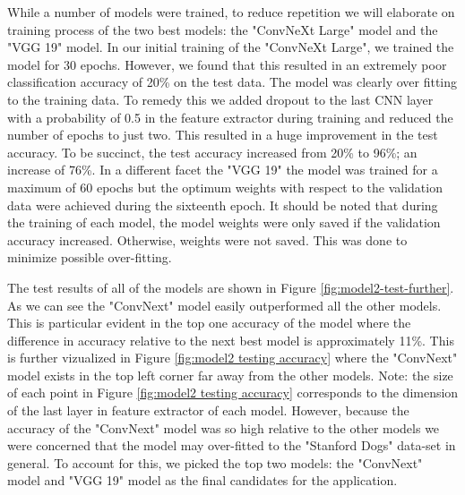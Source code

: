 \documentclass{article}
\begin{document}
While a number of models were trained, to reduce repetition we will elaborate on training process of the two best models: the "ConvNeXt Large" model and the "VGG 19" model.  In our initial training of the "ConvNeXt Large", we trained the model for 30 epochs.  However, we found that this resulted in an extremely poor classification accuracy of 20\% on the test data.  The model was clearly over fitting to the training data.  To remedy this we added dropout to the last CNN layer with a probability of 0.5 in the feature extractor during training and reduced the number of epochs to just two.  This  resulted in a huge improvement in the test accuracy.  To be succinct, the test accuracy increased from 20\% to 96\%; an increase of 76\%.  In a different facet the "VGG 19" the model was trained for a maximum of 60 epochs but the optimum weights with respect to the validation data were achieved during the sixteenth epoch.  It should be noted that during the training of each model, the model weights were only saved if the validation accuracy increased.  Otherwise, weights were not saved.  This was done to minimize possible over-fitting.

The test results of all of the models are shown in Figure \ref{fig:model2-test-further}.  As we can see the "ConvNext" model easily outperformed all the other models.  This is particular evident in the top one accuracy of the model where the difference in accuracy relative to the next best model is approximately 11\%.  This is further vizualized in Figure \ref{fig:model2 testing accuracy} where the  "ConvNext" model exists in the top left corner far away from the other models.  Note: the size of each  point in Figure \ref{fig:model2 testing accuracy} corresponds to the dimension of the last layer in feature extractor of each model.  However, because the accuracy of the "ConvNext" model was so high relative to the other models we were concerned that the model may over-fitted to the "Stanford Dogs" data-set \cite{stanforddogs} in general.  To account for this, we picked the top two models: the  "ConvNext" model and "VGG 19" model as the final candidates for the application.
\end{document}
